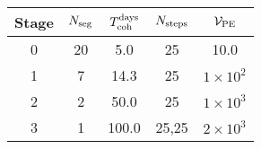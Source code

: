 \begin{tabular}{c|cccc}
Stage & $N_{\rm seg}$ & $T_{\rm coh}^{\rm days}$ &$N_{\rm steps}$ & $\mathcal{V}_{\rm PE}$ \\ \hline
0 & 20 & 5.0 & 25 & 10.0 \\
1 & 7 & 14.3 & 25 & $1{\times}10^{2}$ \\
2 & 2 & 50.0 & 25 & $1{\times}10^{3}$ \\
3 & 1 & 100.0 & 25,25 & $2{\times}10^{3}$ \\
\end{tabular}
